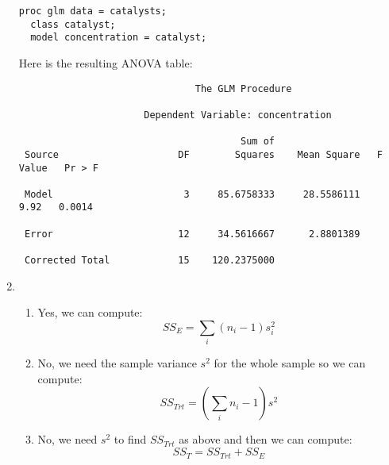 \documentclass[11pt]{article}
\begin{document}
\begin{enumerate}
\begin{verbatim}
proc glm data = catalysts;
  class catalyst;
  model concentration = catalyst;
\end{verbatim}

Here is the resulting ANOVA table:
%
\begin{verbatim}
                               The GLM Procedure
 
                      Dependent Variable: concentration   

                                       Sum of
 Source                     DF        Squares    Mean Square   F Value   Pr > F

 Model                       3     85.6758333     28.5586111      9.92   0.0014

 Error                      12     34.5616667      2.8801389                   

 Corrected Total            15    120.2375000                                  
\end{verbatim}

\item %

\begin{enumerate}

\item %
Yes, we can compute:
\begin{equation*}
SS_E=\sum_i(n_i-1)s^2_i
\end{equation*}

\item %
No, we need the sample variance \(s^2\) for the whole sample so we can compute:
\begin{equation*}
SS_{Trt}=\left(\sum_in_i-1\right)s^2
\end{equation*}

\item %
No, we need \(s^2\) to find \(SS_{Trt}\) as above and then we can compute:
\begin{equation*}
SS_T=SS_{Trt}+SS_E
\end{equation*}

\end{enumerate}

\end{enumerate}
\end{document}
